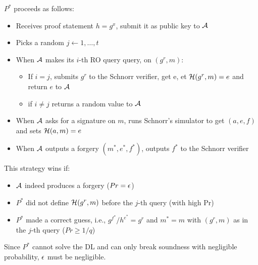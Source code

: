 \documentclass[12pt]{article}
\begin{document}
$P^*$ proceeds as follows:
\begin{itemize}
	\item Receives proof statement $h=g^x$, submit it as public key to $\mathcal{A}$
	\item Picks a random $j \leftarrow {1, \dots, t}$
	\item When $\mathcal{A}$ makes its $i$-th RO query query, on $(g^r,m)$:
	\begin{itemize}
		\item If $i=j$, submits $g^r$ to the Schnorr verifier, get e, et $\mathcal{H}(g^r,m)=e$ and return $e$ to $\mathcal{A}$
		\item if $i \neq j$ returns a random value to $\mathcal{A}$
	\end{itemize}
	\item When $\mathcal{A}$ asks for a signature on $m$, runs Schnorr's simulator to get $(a,e,f)$ and sets $\mathcal{H}(a,m)=e$
	\item When $\mathcal{A}$ outputs a forgery $(m^*,e^*,f^*)$, outputs $f^*$ to the Schnorr verifier 
\end{itemize}


This strategy wins if:
\begin{itemize}
	\item $\mathcal{A}$ indeed produces a forgery ($Pr=\epsilon$)
	\item $P^*$ did not define $\mathcal{H}(g^r,m)$ before the $j$-th query (with high Pr)
	\item $P^*$ made a correct guess, i.e., $g^{f^*} / h^{e^*} = g^r$ and $m^*=m$ with $(g^r,m)$ as in the $j$-th query ($Pr \ge 1/q$) 
\end{itemize}

Since $P^*$ cannot solve the DL and can only break soundness with negligible probability, $\epsilon$ must be negligible.
\end{document}
